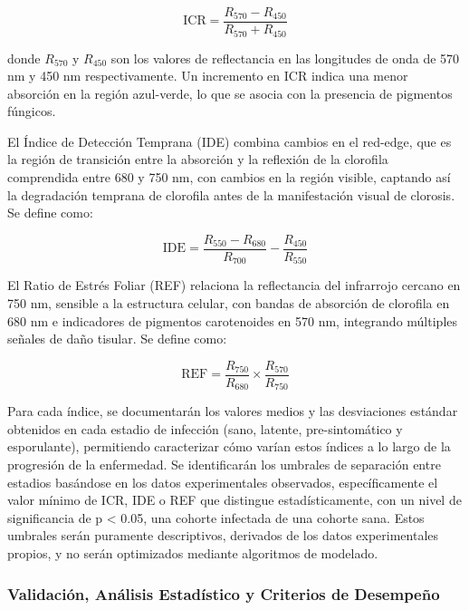 \documentclass[12pt, a4paper]{article}
\begin{document}
	\begin{equation}
		\text{ICR} = \frac{R_{570} - R_{450}}{R_{570} + R_{450}}
	\end{equation}
	
	donde $R_{570}$ y $R_{450}$ son los valores de reflectancia en las longitudes de onda de 570 nm y 450 nm respectivamente. Un incremento en ICR indica una menor absorción en la región azul-verde, lo que se asocia con la presencia de pigmentos fúngicos.
	
	El Índice de Detección Temprana (IDE) combina cambios en el red-edge, que es la región de transición entre la absorción y la reflexión de la clorofila comprendida entre 680 y 750 nm, con cambios en la región visible, captando así la degradación temprana de clorofila antes de la manifestación visual de clorosis. Se define como:
	
	\begin{equation}
		\text{IDE} = \frac{R_{550} - R_{680}}{R_{700}} - \frac{R_{450}}{R_{550}}
	\end{equation}
	
	El Ratio de Estrés Foliar (REF) relaciona la reflectancia del infrarrojo cercano en 750 nm, sensible a la estructura celular, con bandas de absorción de clorofila en 680 nm e indicadores de pigmentos carotenoides en 570 nm, integrando múltiples señales de daño tisular. Se define como:
	
	\begin{equation}
		\text{REF} = \frac{R_{750}}{R_{680}} \times \frac{R_{570}}{R_{750}}
	\end{equation}
	
	Para cada índice, se documentarán los valores medios y las desviaciones estándar obtenidos en cada estadio de infección (sano, latente, pre-sintomático y esporulante), permitiendo caracterizar cómo varían estos índices a lo largo de la progresión de la enfermedad. Se identificarán los umbrales de separación entre estadios basándose en los datos experimentales observados, específicamente el valor mínimo de ICR, IDE o REF que distingue estadísticamente, con un nivel de significancia de p < 0.05, una cohorte infectada de una cohorte sana. Estos umbrales serán puramente descriptivos, derivados de los datos experimentales propios, y no serán optimizados mediante algoritmos de modelado.
	
	\subsubsection{Validación, Análisis Estadístico y Criterios de Desempeño}
	
\end{document}
